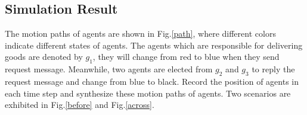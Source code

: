 \documentclass[journal]{IEEEtran}
\begin{document}
\subsection{Simulation Result}
The motion paths of agents are shown in Fig.\ref{path}, where different colors indicate different states of agents. The agents which are responsible for delivering  goods are denoted by $g_1$, they will change from red to blue when they send request message. Meanwhile, two agents are elected from $g_2$ and $g_3$ to reply the request message and change from blue to black. Record the position of agents in each time step and synthesize these motion paths of agents. Two scenarios are exhibited in Fig.\ref{before} and Fig.\ref{across}.\par
\end{document}
